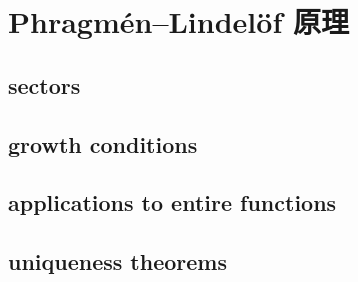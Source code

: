 \section{Phragmén–Lindelöf 原理}
\label{b3:sec:1904}


\subsection{sectors}
\label{b3:subsec:190401}

\subsection{growth conditions}
\label{b3:subsec:190402}

\subsection{applications to entire functions}
\label{b3:subsec:190403}

\subsection{uniqueness theorems}
\label{b3:subsec:190404}


